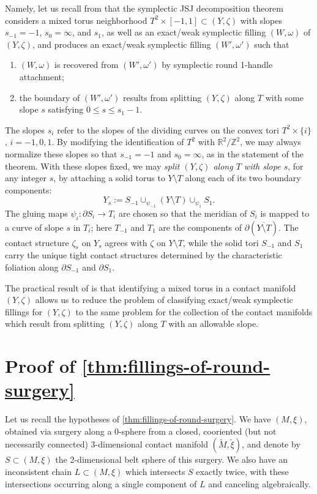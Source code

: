 \documentclass[11pt]{amsart}
\numberwithin{equation}{section}
\theoremstyle{plain}
\theoremstyle{definition}
\theoremstyle{remark}\newtheorem{rem}[equation]{Remark}%
\theoremstyle{remark}\newtheorem{obs}[equation]{Observation}%
\begin{document}
Namely, let us recall from  that the symplectic JSJ decomposition theorem considers a mixed torus neighborhood $T^2\times[-1,1]\subset(Y,\zeta)$ with slopes $s_{-1}=-1$, $s_0=\infty$, and $s_1$, as well as an exact/weak symplectic filling $(W,\omega)$ of $(Y,\zeta)$, and produces an exact/weak symplectic filling $(W',\omega')$ such that
\begin{enumerate}
    \item $(W,\omega)$ is recovered from $(W',\omega')$ by symplectic round 1-handle attachment;
    \item the boundary of $(W',\omega')$ results from splitting $(Y,\zeta)$ along $T$ with some slope $s$ satisfying $0\leq s\leq s_1-1$.
\end{enumerate}
The slopes $s_i$ refer to the slopes of the dividing curves on the convex tori $T^2\times\{i\}$, $i=-1,0,1$.  By modifying the identification of $T^2$ with $\mathbb{R}^2/\mathbb{Z}^2$, we may always normalize these slopes so that $s_{-1}=-1$ and $s_0=\infty$, as in the statement of the theorem.  With these slopes fixed, we may \emph{split $(Y,\zeta)$ along $T$ with slope $s$}, for any integer $s$, by attaching a solid torus to $Y\setminus T$ along each of its two boundary components:
\[
Y_s := S_{-1} \cup_{\psi_{-1}} (Y\setminus T) \cup_{\psi_1} S_1.
\]
The gluing maps $\psi_i\colon\partial S_i\to T_i$ are chosen so that the meridian of $S_i$ is mapped to a curve of slope $s$ in $T_i$; here $T_{-1}$ and $T_1$ are the components of $\partial(\overline{Y\setminus T})$.
 The contact structure $\zeta_s$ on $Y_s$ agrees with $\zeta$ on $Y\setminus T$, while the solid tori $S_{-1}$ and $S_1$ carry the unique tight contact structures determined by the characteristic foliation along $\partial S_{-1}$ and $\partial S_1$.

 The practical result of  is that identifying a mixed torus in a contact manifold $(Y,\zeta)$ allows us to reduce the problem of classifying exact/weak symplectic fillings for $(Y,\zeta)$ to the same problem for the collection of the contact manifolds which result from splitting $(Y,\zeta)$ along $T$ with an allowable slope.



\section{Proof of \cref{thm:fillings-of-round-surgery}}\label{sec:proof}


Let us recall the hypotheses of \cref{thm:fillings-of-round-surgery}.  We have $(M,\xi)$, obtained via surgery along a 0-sphere from a closed, cooriented (but not necessarily connected) 3-dimensional contact manifold $(\tilde{M},\tilde{\xi})$, and denote by $S\subset (M,\xi)$ the 2-dimensional belt sphere of this surgery.  We also have an inconsistent chain $L\subset(M,\xi)$ which intersects $S$ exactly twice, with these intersections occurring along a single component of $L$ and canceling algebraically.
\end{document}
